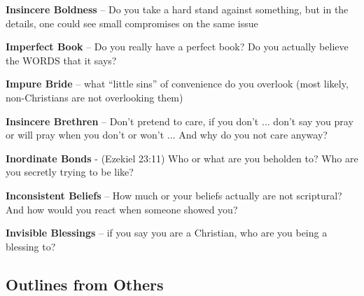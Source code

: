 \begin{compactenum}[I.]
	\item  \textbf{Insincere Boldness} -- Do you take a hard stand against something, but in  the details, one could see small compromises on the same issue
	\item \textbf{Imperfect Book} -- Do you really have a perfect book? Do you actually believe  the WORDS that it says?
	\item \textbf{Impure Bride} -- what ``little sins'' of convenience do you overlook (most likely, non-Christians are not overlooking them)
	\item \textbf{Insincere Brethren} -- Don't pretend to care, if you don't $\hdots$  don't say you pray or will pray when you don't or won't $\hdots$ And why do you not care  anyway?
	\item \textbf{Inordinate Bonds} - (Ezekiel 23:11) Who or what are you beholden to? Who are you secretly trying to be like?
	\item \textbf{Inconsistent Beliefs} -- How much or your beliefs actually are not scriptural? And how would you react when someone showed you?
	\item \textbf{Invisible Blessings} -- if you say you are a Christian, who are you being a blessing to?
\end{compactenum}



\subsection{Outlines from Others}

